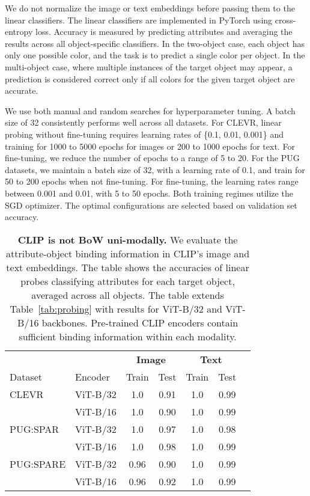 We do not normalize the image or text embeddings before passing them to the linear classifiers. The linear classifiers are implemented in PyTorch using cross-entropy loss. Accuracy is measured by predicting attributes and averaging the results across all object-specific classifiers. In the two-object case, each object has only one possible color, and the task is to predict a single color per object. In the multi-object case, where multiple instances of the target object may appear, a prediction is considered correct only if all colors for the given target object are accurate.

We use both manual and random searches for hyperparameter tuning. A batch size of 32 consistently performs well across all datasets. For CLEVR, linear probing without fine-tuning requires learning rates of \{0.1, 0.01, 0.001\} and training for 1000 to 5000 epochs for images or 200 to 1000 epochs for text. For fine-tuning, we reduce the number of epochs to a range of 5 to 20. For the PUG datasets, we maintain a batch size of 32, with a learning rate of 0.1, and train for 50 to 200 epochs when not fine-tuning. For fine-tuning, the learning rates range between 0.001 and 0.01, with 5 to 50 epochs. Both training regimes utilize the SGD optimizer. The optimal configurations are selected based on validation set accuracy.



\begin{table}
  \centering
    \small
  \setlength{\tabcolsep}{.8em}
  \begin{tabularx}{\columnwidth}{ll*{5}{c}}
    \toprule
    \multicolumn{2}{c}{} & \multicolumn{2}{c}{\textbf{Image}} & \multicolumn{2}{c}{\textbf{Text}} \\ \cmidrule(lr){3-4} \cmidrule(lr){5-6}
    Dataset & Encoder & Train & Test & Train & Test \\ \midrule
    CLEVR & ViT-B/32 & 1.0 & 0.91 & 1.0 & 0.99 \\
         & ViT-B/16 & 1.0 & 0.90 & 1.0 & 0.99 \\ \midrule
    PUG:SPAR & ViT-B/32 & 1.0 & 0.97 & 1.0 & 0.98 \\
         & ViT-B/16 & 1.0 & 0.98 & 1.0 & 0.99 \\ \midrule
    PUG:SPARE & ViT-B/32 & 0.96 & 0.90 & 1.0 & 0.99 \\
         & ViT-B/16 & 0.96 & 0.92 & 1.0 & 0.99 \\
    \bottomrule
  \end{tabularx}
  \caption{\textbf{CLIP is not BoW uni-modally.} We evaluate the attribute-object binding information in CLIP's image and text embeddings. The table shows the accuracies of linear probes classifying attributes for each target object, averaged across all objects. The table extends Table~\ref{tab:probing} with results for ViT-B/32 and ViT-B/16 backbones. Pre-trained CLIP encoders contain sufficient binding information within each modality.}
  \label{tab:probing_extra}
  \vspace{-1em}
\end{table}

